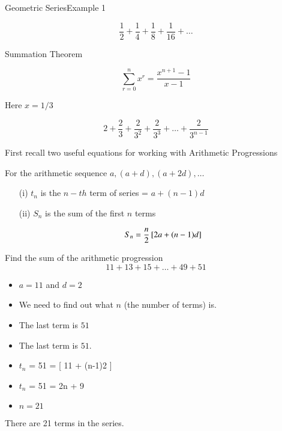 \documentclass[12pt]{article}
\begin{document}
{Geometric Series}{Example 1}


\[ \frac{1}{2} + \frac{1}{4} + \frac{1}{8} +  \frac{1}{16} +\ldots  \]





Summation Theorem

\[ \sum^{n}_{r=0} x^r = \frac{x^{n+1}-1}{x-1} \]

Here $x = 1/3$

\[  2 + \frac{2}{3} + \frac{2}{3^2} + \frac{2}{3^3} +  \ldots + \frac{2}{3^{n-1}} \]


First recall two useful equations for working with Arithmetic Progressions

For the arithmetic sequence $a,(a+d) ,(a+2d), \ldots$

\begin{itemize}
\item[(i)] $t_n$ is the $n-th$ term of series = $a+(n-1)d$

\item[(ii)] $S_n$ is the sum of the first $n$ terms

\[ S_n  = {n \over 2} \left[ 2a+(n-1)d \right] \]
\end{itemize}



Find the sum of the arithmetic progression
{
\[ 11 + 13 + 15 + \dots + 49 + 51 \]
}

\begin{itemize}
\item $a=11$ and $d=2$
\item We need to find out what $n$ (the number of terms) is.
\item The last term is $51$
\end{itemize}




\begin{itemize}
\item The last term is $51$.
\item $t_n$ = 51 = [ 11 + (n-1)2 ] 
\item $t_n$ = 51 = 2n + 9
\item $n=21$
\end{itemize}
There are 21 terms in the series.
\end{document}
